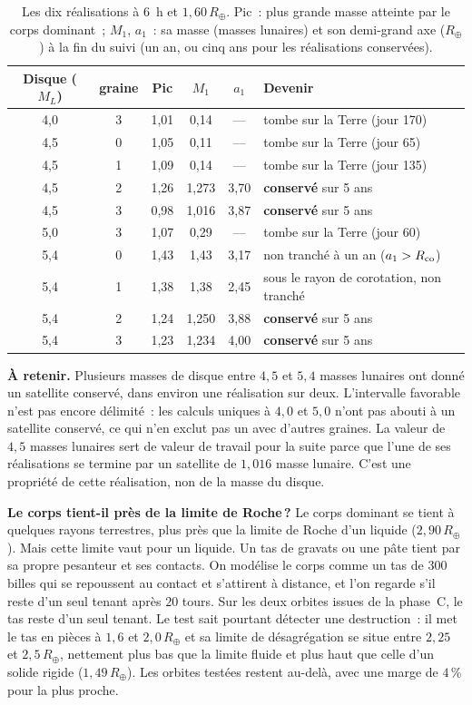 \documentclass[11pt,a4paper]{article}
\newcommand{\Rt}{\ensuremath{R_\oplus}}
\newcommand{\ML}{\ensuremath{M_L}}
\begin{document}
\begin{table}[htbp]
\centering
\caption{Les dix réalisations à $6$~h et $1{,}60\,\Rt$. Pic~: plus grande masse atteinte par le corps dominant~; $M_1$, $a_1$~: sa masse (masses lunaires) et son demi-grand axe ($\Rt$) à la fin du suivi (un an, ou cinq ans pour les réalisations conservées).\label{tab:M45}}
\small
\begin{tabular}{ccccc>{\raggedright\arraybackslash}p{6.0cm}}
\toprule
Disque ($\ML$) & graine & Pic & $M_1$ & $a_1$ & Devenir \\
\midrule
4,0 & 3 & 1,01 & 0,14 & --- & tombe sur la Terre (jour 170) \\
4,5 & 0 & 1,05 & 0,11 & --- & tombe sur la Terre (jour 65) \\
4,5 & 1 & 1,09 & 0,14 & --- & tombe sur la Terre (jour 135) \\
4,5 & 2 & 1,26 & 1,273 & 3,70 & \textbf{conservé} sur 5 ans \\
4,5 & 3 & 0,98 & 1,016 & 3,87 & \textbf{conservé} sur 5 ans \\
5,0 & 3 & 1,07 & 0,29 & --- & tombe sur la Terre (jour 60) \\
5,4 & 0 & 1,43 & 1,43 & 3,17 & non tranché à un an ($a_1>R_{\rm co}$) \\
5,4 & 1 & 1,38 & 1,38 & 2,45 & sous le rayon de corotation, non tranché \\
5,4 & 2 & 1,24 & 1,250 & 3,88 & \textbf{conservé} sur 5 ans \\
5,4 & 3 & 1,23 & 1,234 & 4,00 & \textbf{conservé} sur 5 ans \\
\bottomrule
\end{tabular}
\end{table}

\textbf{À retenir.} Plusieurs masses de disque entre $4{,}5$ et $5{,}4$ masses lunaires ont donné un satellite conservé, dans environ une réalisation sur deux. L'intervalle favorable n'est pas encore délimité~: les calculs uniques à $4{,}0$ et $5{,}0$ n'ont pas abouti à un satellite conservé, ce qui n'en exclut pas un avec d'autres graines. La valeur de $4{,}5$ masses lunaires sert de valeur de travail pour la suite parce que l'une de ses réalisations se termine par un satellite de $1{,}016$ masse lunaire. C'est une propriété de cette réalisation, non de la masse du disque.

\textbf{Le corps tient-il près de la limite de Roche\,?} Le corps dominant se tient à quelques rayons terrestres, plus près que la limite de Roche d'un liquide ($2{,}90\,\Rt$). Mais cette limite vaut pour un liquide. Un tas de gravats ou une pâte tient par sa propre pesanteur et ses contacts. On modélise le corps comme un tas de $300$ billes qui se repoussent au contact et s'attirent à distance, et l'on regarde s'il reste d'un seul tenant après $20$ tours. Sur les deux orbites issues de la phase~C, le tas reste d'un seul tenant. Le test sait pourtant détecter une destruction~: il met le tas en pièces à $1{,}6$ et $2{,}0\,\Rt$ et sa limite de désagrégation se situe entre $2{,}25$ et $2{,}5\,\Rt$, nettement plus bas que la limite fluide et plus haut que celle d'un solide rigide ($1{,}49\,\Rt$). Les orbites testées restent au-delà, avec une marge de $4\,\%$ pour la plus proche.
\end{document}
